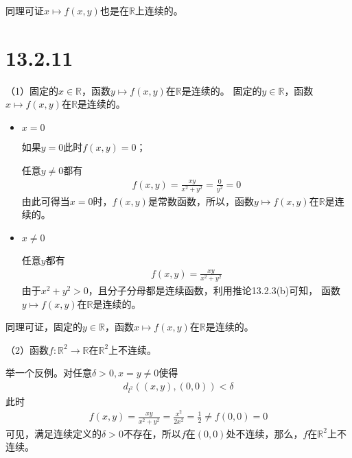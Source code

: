 \documentclass{article}
\begin{document}
同理可证$x \mapsto f(x, y)$也是在$\mathbb{R}$上连续的。

\section*{13.2.11}

（1）固定的$x \in \mathbb{R}$，函数$y \mapsto f(x, y)$在$\mathbb{R}$是连续的。
固定的$y \in \mathbb{R}$，函数$x \mapsto f(x, y)$在$\mathbb{R}$是连续的。

\begin{itemize}
  \item $x = 0$

        如果$y = 0$此时$f(x, y) = 0$；

        任意$y \neq 0$都有
        \begin{align*}
          f(x, y) = \frac{xy}{x^2 + y^2} = \frac{0}{y^2} = 0
        \end{align*}
        由此可得当$x = 0$时，$f(x, y)$是常数函数，所以，函数$y \mapsto f(x, y)$在$\mathbb{R}$是连续的。


  \item $x \neq 0$

        任意$y$都有
        \begin{align*}
          f(x, y) = \frac{xy}{x^2 + y^2}
        \end{align*}
        由于$x^2 + y^2 > 0$，且分子分母都是连续函数，利用推论13.2.3(b)可知，
        函数$y \mapsto f(x, y)$在$\mathbb{R}$是连续的。

\end{itemize}

同理可证，固定的$y \in \mathbb{R}$，函数$x \mapsto f(x, y)$在$\mathbb{R}$是连续的。

（2）函数$f: \mathbb{R}^2 \to \mathbb{R}$在$\mathbb{R}^2$上不连续。

举一个反例。对任意$\delta > 0, x = y \neq 0$使得
\begin{align*}
  d_{l^2}((x, y), (0, 0)) < \delta
\end{align*}
此时
\begin{align*}
  f(x, y) = \frac{xy}{x^2 + y^2} = \frac{x^2}{2x^2} = \frac{1}{2} \neq f(0, 0) = 0
\end{align*}
可见，满足连续定义的$\delta > 0$不存在，所以$f$在$(0, 0)$处不连续，那么，$f$在$\mathbb{R}^2$上不连续。
\end{document}
